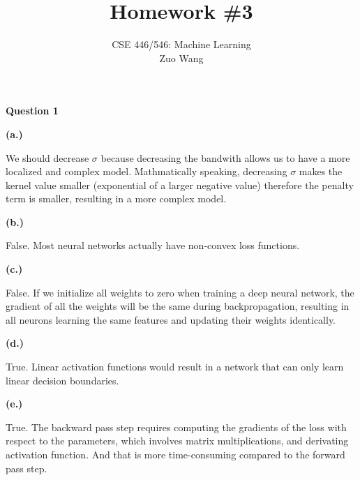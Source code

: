 \documentclass{article}
\begin{document}
\title{Homework \#3}
\author{
    \normalsize{CSE 446/546: Machine Learning}\\
    \normalsize{Zuo Wang}\\
}
\date{{}}
\maketitle


\begin{spacing}{3}{\bfseries\LARGE Question 1}\end{spacing}
\textbf{(a.)}
\begin{flushleft}
    We should decrease $\sigma$ because decreasing the bandwith allows us to have a more localized and complex model.
    Mathmatically speaking, decreasing $\sigma$ makes the kernel value smaller (exponential of a larger negative value)
    therefore the penalty term is smaller, resulting in a more complex model.
\end{flushleft}

\vspace{5mm}\textbf{(b.)}
\begin{flushleft}
    False. Most neural networks actually have non-convex loss functions.
\end{flushleft}

\vspace{5mm}\textbf{(c.)}
\begin{flushleft}
    False. If we initialize all weights to zero when training a deep neural network, the gradient of all the weights will
    be the same during backpropagation, resulting in all neurons learning the same features and updating their weights identically.
\end{flushleft}

\vspace{5mm}\textbf{(d.)}
\begin{flushleft}
    True. Linear activation functions would result in a network that can only learn linear decision boundaries.
\end{flushleft}

\vspace{5mm}\textbf{(e.)}
\begin{flushleft}
    True. The backward pass step requires computing the gradients of the loss with respect to the parameters, 
    which involves matrix multiplications, and derivating activation function. And that is more time-consuming compared to the forward pass step.
\end{flushleft}
\end{document}
